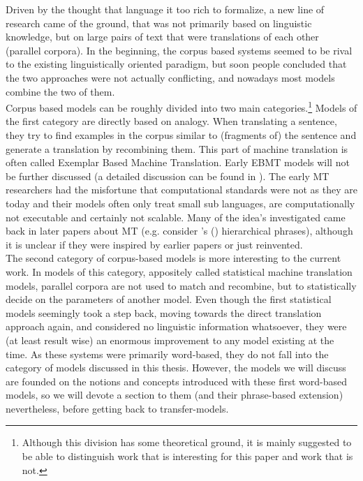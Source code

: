 \documentclass{report}
\theoremstyle{definition}
\theoremstyle{plain}
\def\citepos#1{\citeauthor{#1}'s (\citeyear{#1})}
\begin{document}
Driven by the thought that language it too rich to formalize, a new line of research came of the ground, that was not primarily based on linguistic knowledge, but on large pairs of text that were translations of each other (parallel corpora). In the beginning, the corpus based systems seemed to be rival to the existing linguistically oriented paradigm, but soon people concluded that the two approaches were not actually conflicting, and nowadays most models combine the two of them.\\
Corpus based models can be roughly divided into two main categories.\footnote{Although this division has some theoretical ground, it is mainly suggested to be able to distinguish work that is interesting for this paper and work that is not.} Models of the first category are directly based on analogy. When translating a sentence, they try to find examples in the corpus similar to (fragments of) the sentence and generate a translation by recombining them. This part of machine translation is often called Exemplar Based Machine Translation. Early EBMT models will not be further discussed (a detailed discussion can be found in \cite{somers1999review}). The early MT researchers had the misfortune that computational standards were not as they are today and their models often only treat small sub languages, are computationally not executable and certainly not scalable. Many of the idea's investigated came back in later papers about MT (e.g. consider \citepos{furuse1992example} hierarchical phrases), although it is unclear if they were inspired by earlier papers or just reinvented.\\
The second category of corpus-based models is more interesting to the current work. In models of this category, appositely called statistical machine translation models, parallel corpora are not used to match and recombine, but to statistically decide on the parameters of another model. Even though the first statistical models seemingly took a step back, moving towards the direct translation approach again, and considered no linguistic information whatsoever, they were (at least result wise) an enormous improvement to any model existing at the time. As these systems were primarily word-based, they do not fall into the category of models discussed in this thesis. However, the models we will discuss are founded on the notions and concepts introduced with these first word-based models, so we will devote a section to them (and their phrase-based extension) nevertheless, before getting back to transfer-models.
\end{document}
